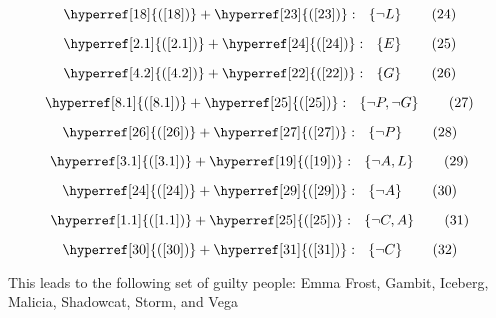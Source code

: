 \documentclass[a4paper]{article}
\newcommand{\refequation}[1]{\hyperref[#1]{(\ref{#1})}}
\begin{document}
\begin{equation}
\refequation{18} + \refequation{23}: \  \ \left\{ \lnot L \right\} \tag{24} \label{24}
\end{equation}

\begin{equation}
\refequation{2.1} + \refequation{24}: \  \ \left\{ E \right\} \tag{25} \label{25}
\end{equation}

\begin{equation}
\refequation{4.2} + \refequation{22}: \  \ \left\{ G \right\} \tag{26} \label{26}
\end{equation}

\begin{equation}
\refequation{8.1} + \refequation{25}: \  \ \left\{ \lnot P , \lnot G \right\} \tag{27} \label{27}
\end{equation}

\begin{equation}
\refequation{26} + \refequation{27}: \  \ \left\{ \lnot P \right\} \tag{28} \label{28}
\end{equation}

\begin{equation}
\refequation{3.1} + \refequation{19}: \  \ \left\{ \lnot A , L \right\} \tag{29} \label{29}
\end{equation}

\begin{equation}
\refequation{24} + \refequation{29}: \  \ \left\{ \lnot A \right\} \tag{30} \label{30}
\end{equation}

\begin{equation}
\refequation{1.1} + \refequation{25}: \  \ \left\{ \lnot C , A \right\} \tag{31} \label{31}
\end{equation}

\begin{equation}
\refequation{30} + \refequation{31}: \  \ \left\{ \lnot C \right\} \tag{32} \label{32}
\end{equation}

This leads to the following set of guilty people: Emma Frost, Gambit, Iceberg, Malicia, Shadowcat, Storm, and Vega
\end{document}

